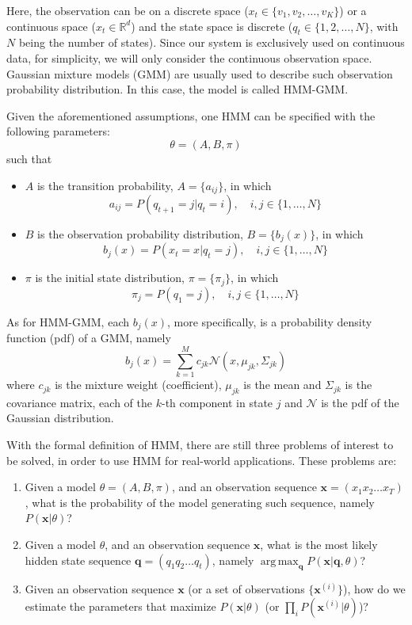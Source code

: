 \documentclass[12pt,final,twoside]{report}
\theoremstyle{plain}
\theoremstyle{definition}
\theoremstyle{remark}
\DeclareMathOperator*{\argmax}{arg\,max}
\begin{document}
Here, the observation can be on a discrete space ($x_t \in \{v_1, v_2, \dots, v_K\}$) or a continuous space ($x_t \in \mathbb{R}^d$) and the state space is discrete ($q_t \in \{1, 2, \dots, N\}$, with $N$ being the number of states). Since our system is exclusively used on continuous data, for simplicity, we will only consider the continuous observation space. Gaussian mixture models (GMM) are usually used to describe such observation probability distribution. In this case, the model is called HMM-GMM.

Given the aforementioned assumptions, one HMM can be specified with the following parameters:
\[ \theta = (A, B, \pi) \]
such that
\begin{itemize}
  \item $A$ is the transition probability, $A = \{a_{ij}\}$, in which 
    \[ a_{ij} = P(q_{t+1} = j | q_t = i), \quad i,j \in \{1, \dots, N\} \]
  \item $B$ is the observation probability distribution, $B = \{b_j(x)\}$, in which
    \[ b_j(x) = P(x_t = x | q_t = j), \quad i,j \in \{1, \dots, N\} \]
  \item $\pi$ is the initial state distribution, $\pi = \{\pi_j\}$, in which
    \[ \pi_j = P(q_1 = j), \quad i,j \in \{1, \dots, N\} \]
\end{itemize}

As for HMM-GMM, each $b_j(x)$, more specifically, is a probability density function (pdf) of a GMM, namely
\[ b_j(x) = \sum_{k=1}^M c_{jk} \mathcal{N}(x, \mu_{jk}, \Sigma_{jk}) \]
where $c_{jk}$ is the mixture weight (coefficient), $\mu_{jk}$ is the mean and $\Sigma_{jk}$ is the covariance matrix, each of the $k$-th component in state $j$ and $\mathcal{N}$ is the pdf of the Gaussian distribution.

With the formal definition of HMM, there are still three problems of interest to be solved, in order to use HMM for real-world applications. These problems are:
\begin{enumerate}
  \item Given a model $\theta=(A, B, \pi)$, and an observation sequence $\mathbf{x} = (x_1 x_2 \dots x_T)$, what is the probability of the model generating such sequence, namely $P(\mathbf{x}|\theta)$?
  \item Given a model $\theta$, and an observation sequence $\mathbf{x}$, what is the most likely hidden state sequence $\mathbf{q} = (q_1 q_2 \dots q_t)$, namely $\argmax_{\mathbf{q}}P(\mathbf{x}|\mathbf{q},\theta)$?
  \item Given an observation sequence $\mathbf{x}$ (or a set of observations $\{\mathbf{x}^{(i)}\}$), how do we estimate the parameters that maximize $P(\mathbf{x}|\theta)$ (or $\prod_{i} P(\mathbf{x}^{(i)}|\theta) $)?
\end{enumerate}
\end{document}
